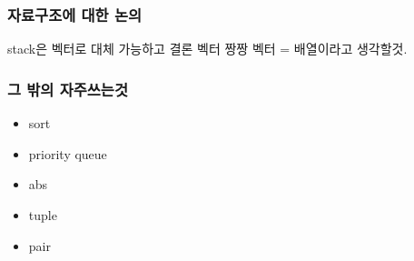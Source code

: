 \documentclass[10pt]{beamer}
\begin{document}
\section{}


\begin{frame}
    \frametitle{자료구조에 대한 논의}
    
\end{frame}



\begin{frame}
    stack은 벡터로 대체 가능하고 결론 벡터 짱짱
    벡터 = 배열이라고 생각할것.
    
\end{frame}









\begin{frame}
    \frametitle{그 밖의 자주쓰는것}
    \begin{itemize}
        \item sort
        \item priority queue
        \item abs
        \item tuple
        \item pair
    \end{itemize}
\end{frame}
\end{document}
